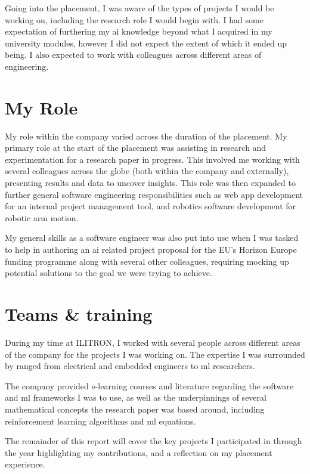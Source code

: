 Going into the placement, I was aware of the types of projects I would be working on,
including the research role I would begin with.
I had some expectation of furthering my \gls{ai} knowledge beyond what I acquired in
my university modules, however I did not expect the extent of which it ended up being.
I also expected to work with colleagues across different areas of engineering.

\section{My Role}

My role within the company varied across the duration of the placement.
My primary role at the start of the placement was assisting in research and experimentation
for a research paper in progress. This involved me working with several colleagues across the globe
(both within the company and externally), presenting results and data to uncover insights.
This role was then expanded to further general software engineering responsibilities such as
web app development for an internal project management tool, and robotics software development
for robotic arm motion.

My general skills as a software engineer was also put into use when I was tasked to help
in authoring an \gls{ai} related project proposal for the EU's Horizon Europe funding programme
along with several other colleagues, requiring mocking up potential solutions
to the goal we were trying to achieve.

\section{Teams \& training}

During my time at ILITRON, I worked with several people across different areas of the company
for the projects I was working on. The expertise I was surrounded by ranged from
electrical and embedded engineers to \gls{ml} researchers.

The company provided e-learning courses and literature regarding the software
and \gls{ml} frameworks I was to use, as well as the underpinnings of several mathematical concepts
the research paper was based around, including reinforcement learning algorithms and
\gls{ml} equations.

The remainder of this report will cover the key projects I participated in through the year
highlighting my contributions, and a reflection on my placement experience.
